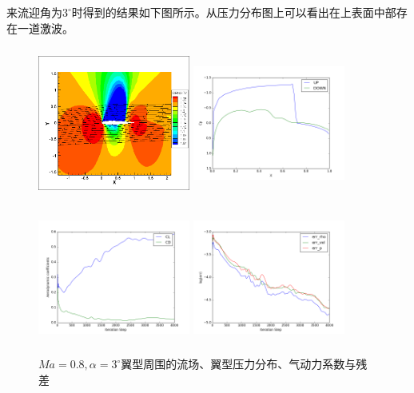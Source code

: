 \documentclass[UTF8]{ctexart}
\begin{document}
\indent 来流迎角为$3^\circ$时得到的结果如下图所示。从压力分布图上可以看出在上表面中部存在一道激波。
\begin{figure}[htbp]\centering
  \begin{minipage}{5.5cm}
    \centering
    \includegraphics[height=5cm,width=5cm]{../pic/0.8_3_flowfield.png}
  \end{minipage}%
  \begin{minipage}{5.5cm}
    \centering
    \includegraphics[height=5cm,width=5cm]{../pic/0.8_3_Cp.png}
  \end{minipage}

  \begin{minipage}{5.5cm}
    \centering
    \includegraphics[height=5cm,width=5cm]{../pic/0.8_3_cl_cd.png}
  \end{minipage}%
  \begin{minipage}{5.5cm}
    \centering
    \includegraphics[height=5cm,width=5cm]{../pic/0.8_3_residual.png}
  \end{minipage}
  \caption{$Ma=0.8,\alpha=3^\circ$翼型周围的流场、翼型压力分布、气动力系数与残差}
\end{figure}
\end{document}
